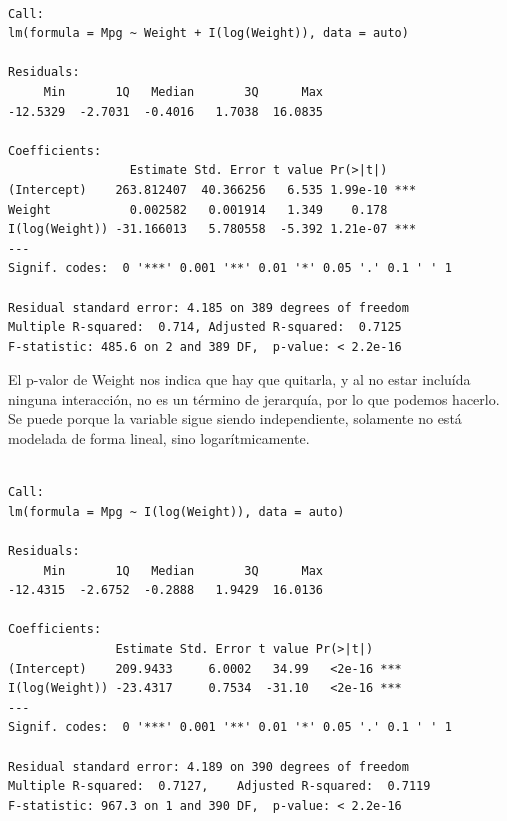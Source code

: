 \documentclass[
]{article}
\newenvironment{Shaded}{\begin{snugshade}}{\end{snugshade}}
\newcommand{\DataTypeTok}[1]{\textcolor[rgb]{0.13,0.29,0.53}{#1}}
\newcommand{\KeywordTok}[1]{\textcolor[rgb]{0.13,0.29,0.53}{\textbf{#1}}}
\newcommand{\NormalTok}[1]{#1}
\newcommand{\OperatorTok}[1]{\textcolor[rgb]{0.81,0.36,0.00}{\textbf{#1}}}
\newcommand{\StringTok}[1]{\textcolor[rgb]{0.31,0.60,0.02}{#1}}
\begin{document}
\begin{Shaded}
\end{Shaded}

\begin{verbatim}

Call:
lm(formula = Mpg ~ Weight + I(log(Weight)), data = auto)

Residuals:
     Min       1Q   Median       3Q      Max 
-12.5329  -2.7031  -0.4016   1.7038  16.0835 

Coefficients:
                 Estimate Std. Error t value Pr(>|t|)    
(Intercept)    263.812407  40.366256   6.535 1.99e-10 ***
Weight           0.002582   0.001914   1.349    0.178    
I(log(Weight)) -31.166013   5.780558  -5.392 1.21e-07 ***
---
Signif. codes:  0 '***' 0.001 '**' 0.01 '*' 0.05 '.' 0.1 ' ' 1

Residual standard error: 4.185 on 389 degrees of freedom
Multiple R-squared:  0.714, Adjusted R-squared:  0.7125 
F-statistic: 485.6 on 2 and 389 DF,  p-value: < 2.2e-16
\end{verbatim}

El p-valor de Weight nos indica que hay que quitarla, y al no estar
incluída ninguna interacción, no es un término de jerarquía, por lo que
podemos hacerlo. Se puede porque la variable sigue siendo independiente,
solamente no está modelada de forma lineal, sino logarítmicamente.

\begin{Shaded}
\end{Shaded}

\begin{verbatim}

Call:
lm(formula = Mpg ~ I(log(Weight)), data = auto)

Residuals:
     Min       1Q   Median       3Q      Max 
-12.4315  -2.6752  -0.2888   1.9429  16.0136 

Coefficients:
               Estimate Std. Error t value Pr(>|t|)    
(Intercept)    209.9433     6.0002   34.99   <2e-16 ***
I(log(Weight)) -23.4317     0.7534  -31.10   <2e-16 ***
---
Signif. codes:  0 '***' 0.001 '**' 0.01 '*' 0.05 '.' 0.1 ' ' 1

Residual standard error: 4.189 on 390 degrees of freedom
Multiple R-squared:  0.7127,    Adjusted R-squared:  0.7119 
F-statistic: 967.3 on 1 and 390 DF,  p-value: < 2.2e-16
\end{verbatim}
\end{document}
